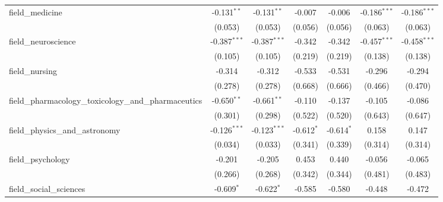 \begin{tabular}{lcccccc}
   field\_medicine                                             & -0.131$^{**}$  & -0.131$^{**}$  & -0.007         & -0.006         & -0.186$^{***}$ & -0.186$^{***}$\\   
                                                               & (0.053)        & (0.053)        & (0.056)        & (0.056)        & (0.063)        & (0.063)\\   
   field\_neuroscience                                         & -0.387$^{***}$ & -0.387$^{***}$ & -0.342         & -0.342         & -0.457$^{***}$ & -0.458$^{***}$\\   
                                                               & (0.105)        & (0.105)        & (0.219)        & (0.219)        & (0.138)        & (0.138)\\   
   field\_nursing                                              & -0.314         & -0.312         & -0.533         & -0.531         & -0.296         & -0.294\\   
                                                               & (0.278)        & (0.278)        & (0.668)        & (0.666)        & (0.466)        & (0.470)\\   
   field\_pharmacology\_toxicology\_and\_pharmaceutics         & -0.650$^{**}$  & -0.661$^{**}$  & -0.110         & -0.137         & -0.105         & -0.086\\   
                                                               & (0.301)        & (0.298)        & (0.522)        & (0.520)        & (0.643)        & (0.647)\\   
   field\_physics\_and\_astronomy                              & -0.126$^{***}$ & -0.123$^{***}$ & -0.612$^{*}$   & -0.614$^{*}$   & 0.158          & 0.147\\   
                                                               & (0.034)        & (0.033)        & (0.341)        & (0.339)        & (0.314)        & (0.314)\\   
   field\_psychology                                           & -0.201         & -0.205         & 0.453          & 0.440          & -0.056         & -0.065\\   
                                                               & (0.266)        & (0.268)        & (0.342)        & (0.344)        & (0.481)        & (0.483)\\   
   field\_social\_sciences                                     & -0.609$^{*}$   & -0.622$^{*}$   & -0.585         & -0.580         & -0.448         & -0.472\\   

\end{tabular}
